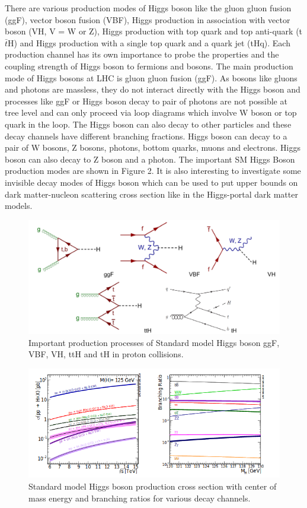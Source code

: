 \documentclass[final,3p]{CSP}
\begin{document}
 \newpage

There are various production modes of Higgs boson like the gluon gluon fusion (ggF), vector boson fusion (VBF), Higgs 
production in association with vector boson (VH, V = W or Z), Higgs production with top quark and top anti-quark (t$\bar{t}$H) and Higgs 
production with a single top quark and a quark jet (tHq). Each production channel has its own importance to probe the 
properties and the coupling strength of Higgs boson to fermions and bosons. The main production mode of Higgs bosons at LHC is 
gluon gluon fusion (ggF). As bosons like gluons and photons are massless, they do not interact directly with the Higgs boson 
and processes like ggF or Higgs boson decay to pair of photons are not possible at tree level and can only proceed via loop 
diagrams which involve W boson or top quark in the loop. The Higgs boson can also decay to other particles and these decay 
channels have different branching fractions. Higgs boson can decay to a pair of W bosons, Z bosons, photons, bottom quarks, 
muons and electrons. Higgs boson can also decay to Z boson and a photon. The important SM Higgs Boson production modes are shown in Figure 2. It is also interesting to investigate some invisible 
decay modes of Higgs boson which can be used to put upper bounds on dark matter-nucleon scattering cross section like in the 
Higgs-portal dark matter models.\\

\begin{figure}[H]
	\centering
	\includegraphics[width=\columnwidth]{./pg.png}
	\caption{Important production processes of Standard model Higgs boson ggF, VBF, VH, ttH and tH in proton collisions.}
	\label{figure 2}
\end{figure}


\begin{figure}[H]
  \centering
   \includegraphics[width=\columnwidth]{./cd2.png}
  \caption{Standard model Higgs boson production cross section with center of mass energy and branching ratios for various decay channels.}
   \label{figure 3}
\end{figure}
\end{document}
